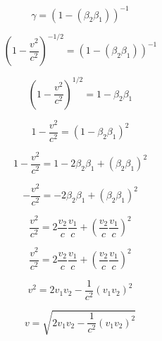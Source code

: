 \documentclass[10pt,a4paper]{article}
\begin{document}
$$\gamma = (1 -(\beta_2\beta_1))^{-1}$$

$$(1- \dfrac{v^2}{c^2})^{-1/2} = (1 -(\beta_2\beta_1))^{-1}$$

$$(1- \dfrac{v^2}{c^2})^{1/2} = 1 -\beta_2\beta_1$$

$$1- \dfrac{v^2}{c^2} = (1 -\beta_2\beta_1)^2$$

$$1- \dfrac{v^2}{c^2} = 1 -2\beta_2\beta_1+(\beta_2\beta_1)^2$$

$$- \dfrac{v^2}{c^2} =  -2\beta_2\beta_1+(\beta_2\beta_1)^2$$

$$\dfrac{v^2}{c^2} =  2\dfrac{v_2}{c}\dfrac{v_1}{c}+(\dfrac{v_2}{c}\dfrac{v_1}{c})^2$$

$$\dfrac{v^2}{c^2} =  2\dfrac{v_2}{c}\dfrac{v_1}{c}+(\dfrac{v_2}{c}\dfrac{v_1}{c})^2$$

$$v^2 =  2v_1v_2-\frac{1}{c^2}(v_1v_2)^2$$

$$v =  \sqrt{2v_1v_2-\frac{1}{c^2}(v_1v_2)^2}$$
\end{document}

